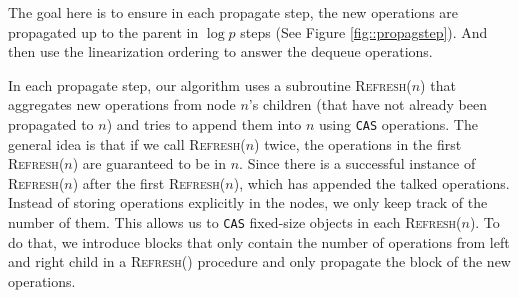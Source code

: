 \documentclass[12pt]{article}
\begin{document}
The goal here is to ensure in each propagate step, the new operations are propagated up to the parent in $\log p$ steps (See Figure \ref{fig::propagstep}). And then use the linearization ordering to answer the dequeue operations.


In each propagate step, our algorithm uses a subroutine \textsc{Refresh}($n$) that aggregates new operations from node $n$'s children (that have not already been propagated to $n$) and tries to append them into $n$ using \texttt{CAS} operations. The general idea is that if we call \textsc{Refresh}($n$) twice, the operations in the first \textsc{Refresh}($n$) are guaranteed to be in $n$. Since there is a successful instance of \textsc{Refresh}($n$) after the first \textsc{Refresh}($n$), which has appended the talked operations. Instead of storing operations explicitly in the nodes, we only keep track of the number of them. This allows us to \texttt{CAS} fixed-size objects in each \textsc{Refresh}($n$). To do that, we introduce blocks that only contain the number of operations from left and right child in a \textsc{Refresh}() procedure and only propagate the block of the new operations.
\end{document}
